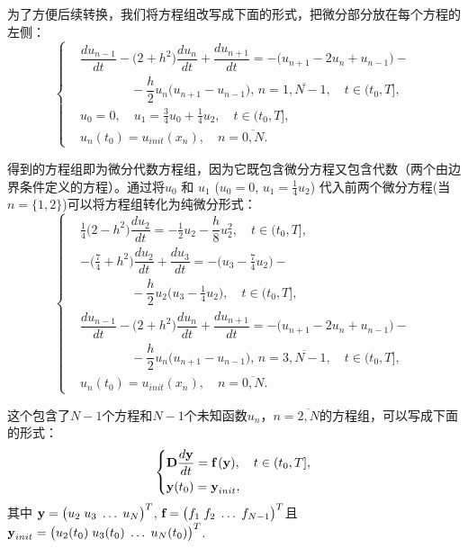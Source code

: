 \documentclass[twoside]{book}
\def\textbf{\bf}%
\begin{document}
\begin{CJK*}{GBK}{song}
为了方便后续转换，我们将方程组改写成下面的形式，把微分部分放在每个方程的左侧：
\begin{equation*}
    \left\{
    \begin{aligned}
        &\dfrac{d u_{n - 1}}{d t} - \big(2 + h^2\big)\dfrac{d u_n}{d t} + \dfrac{d u_{n + 1}}{d t} = - \big(u_{n + 1} - 2u_n + u_{n - 1}\big) - \\
        &\qquad\qquad - \dfrac{h}{2}u_n \big(u_{n + 1} - u_{n - 1}\big), \, n = \overline{1,N - 1}, \quad t \in (t_0,T], \\
        &u_0 = 0, \quad u_1 = \frac{3}{4}u_0 + \frac{1}{4}u_2, \quad t \in (t_0,T], \\
        &u_n(t_0) = u_{init}(x_n), \quad n = \overline{0,N}.
    \end{aligned}
    \right.
\end{equation*}

得到的方程组即为微分代数方程组，因为它既包含微分方程又包含代数（两个由边界条件定义的方程）。通过将$u_0$ 和 $u_1$ ($u_0 = 0$, $u_1 = \frac{1}{4}u_2$) 代入前两个微分方程(当$n = \{1,2\}$)可以将方程组转化为纯微分形式：
\begin{equation*}
    \left\{
    \begin{aligned}
        &\frac{1}{4}\big(2 - h^2\big)\dfrac{d u_{2}}{d t} = -\frac{1}{2}u_2 - \dfrac{h}{8} u_{2}^2, \quad t \in (t_0,T], \\
        &-\Big(\frac{7}{4} + h^2\Big)\dfrac{d u_2}{d t} + \dfrac{d u_{3}}{d t} = - \Big(u_{3} - \frac{7}{4}u_{2}\Big) - \\
        &\qquad\qquad - \dfrac{h}{2}u_2 \Big(u_{3} - \frac{1}{4}u_{2}\Big), \quad t \in (t_0,T], \\
        &\dfrac{d u_{n - 1}}{d t} - \big(2 + h^2\big)\dfrac{d u_n}{d t} + \dfrac{d u_{n + 1}}{d t} = - \big(u_{n + 1} - 2u_n + u_{n - 1}\big) - \\
        &\qquad\qquad - \dfrac{h}{2}u_n \big(u_{n + 1} - u_{n - 1}\big), \, n = \overline{3,N - 1}, \quad t \in (t_0,T], \\
        &u_n(t_0) = u_{init}(x_n), \quad n = \overline{0,N}.
    \end{aligned}
    \right.
\end{equation*}

这个包含了$N - 1$个方程和$N - 1$个未知函数$u_{n}$，$n = \overline{2,N}$的方程组，可以写成下面的形式：
\begin{equation}
    \label{Ch_2_System_of_ODEs}
    \left\{
    \begin{aligned}
        &\emph{\textbf{D}} \dfrac{d \emph{\textbf{y}}}{d t} = \emph{\textbf{f}} \, (\emph{\textbf{y}}), \quad t \in (t_0,T],\\
        &\emph{\textbf{y}}(t_0) = \emph{\textbf{y}}_{init},
    \end{aligned}
    \right.
\end{equation}
其中 $\emph{\textbf{y}} = \big(u_2 \; u_3 \;  \ldots \; u_{N} \big)^T$, $\emph{\textbf{f}} = \big(f_1 \; f_2 \; \ldots \; f_{N - 1}\big)^T$且$\emph{\textbf{y}}_{init} = \big(u_2(t_0) \; u_3(t_0) \;  \ldots \; u_{N}(t_0)\big)^T$.


\end{CJK*}
\end{document}
